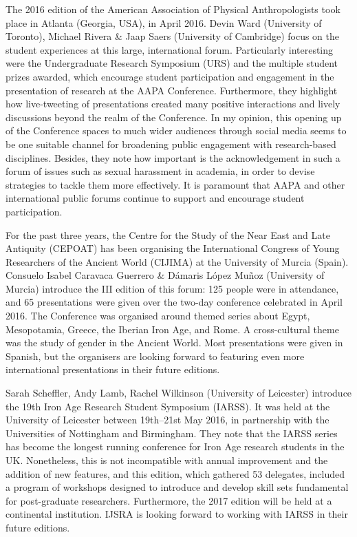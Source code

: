 \IJSRAseparator

The 2016 edition of the American Association of Physical Anthropologists took place in Atlanta (Georgia, USA), in April 2016. 
\marginnote{\cpageref{}}
Devin Ward (University of Toronto), Michael Rivera \& Jaap Saers (University of Cambridge) focus on the student experiences at this large, international forum. Particularly interesting were the Undergraduate Research Symposium (URS) and the multiple student prizes awarded, which encourage student participation and engagement in the presentation of research at the AAPA Conference. Furthermore, they highlight how live-tweeting of presentations created many positive interactions and lively discussions beyond the realm of the Conference. In my opinion, this opening up of the Conference spaces to much wider audiences through social media seems to be one suitable channel for broadening public engagement with research-based disciplines. Besides, they note how important is the acknowledgement in such a forum of issues such as sexual harassment in academia, in order to devise strategies to tackle them more effectively. It is paramount that AAPA and other international public forums continue to support and encourage student participation.

For the past three years, the Centre for the Study of the Near East and Late Antiquity (CEPOAT) has been organising the International Congress of Young Researchers of the Ancient World (CIJIMA) at the University of Murcia (Spain). Consuelo Isabel Caravaca Guerrero \& Dámaris López Muñoz (University of Murcia) introduce the III edition of this forum: 125 people were in attendance, and 65 presentations were given over the two-day conference celebrated in April 2016. The Conference was organised around themed series about Egypt, Mesopotamia, Greece, the Iberian Iron Age, and Rome. A cross-cultural theme was the study of gender in the Ancient World. Most presentations were given in Spanish, but the organisers are looking forward to featuring even more international presentations in their future editions.

Sarah Scheffler, Andy Lamb, Rachel Wilkinson (University of Leicester) introduce the 19th Iron Age Research Student Symposium (IARSS). It was held at the University of Leicester between 19th–21st May 2016, in partnership with the Universities of Nottingham and Birmingham. They note that the IARSS series has become the longest running conference for Iron Age research students in the UK. Nonetheless, this is not incompatible with annual improvement and the addition of new features, and this edition, which gathered 53 delegates, included a program of workshops designed to introduce and develop skill sets fundamental for post-graduate researchers. Furthermore, the 2017 edition will be held at a continental institution. IJSRA is looking forward to working with IARSS in their future editions.

